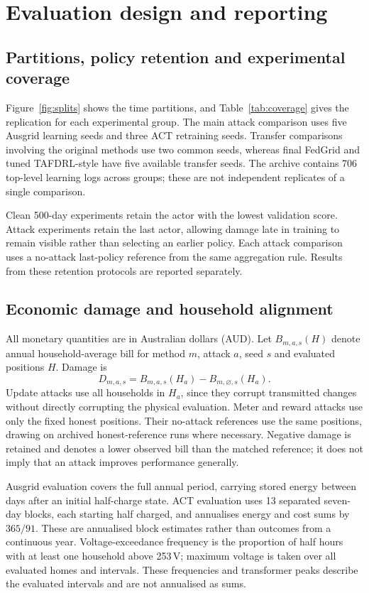 \section{Evaluation design and reporting}
\label{sec:evaluation}
\subsection{Partitions, policy retention and experimental coverage}
Figure~\ref{fig:splits} shows the time partitions, and Table~\ref{tab:coverage} gives the replication for each experimental group. The main attack comparison uses five Ausgrid learning seeds and three ACT retraining seeds. Transfer comparisons involving the original methods use two common seeds, whereas final FedGrid and tuned TAFDRL-style have five available transfer seeds. The archive contains 706 top-level learning logs across groups; these are not independent replicates of a single comparison.

Clean 500-day experiments retain the actor with the lowest validation score. Attack experiments retain the last actor, allowing damage late in training to remain visible rather than selecting an earlier policy. Each attack comparison uses a no-attack last-policy reference from the same aggregation rule. Results from these retention protocols are reported separately.



\subsection{Economic damage and household alignment}
All monetary quantities are in Australian dollars (AUD). Let $B_{m,a,s}(H)$ denote annual household-average bill for method $m$, attack $a$, seed $s$ and evaluated positions $H$. Damage is
\begin{equation}
D_{m,a,s}=B_{m,a,s}(H_a)-B_{m,\varnothing,s}(H_a).
\end{equation}
Update attacks use all households in $H_a$, since they corrupt transmitted changes without directly corrupting the physical evaluation. Meter and reward attacks use only the fixed honest positions. Their no-attack references use the same positions, drawing on archived honest-reference runs where necessary. Negative damage is retained and denotes a lower observed bill than the matched reference; it does not imply that an attack improves performance generally.

Ausgrid evaluation covers the full annual period, carrying stored energy between days after an initial half-charge state. ACT evaluation uses 13 separated seven-day blocks, each starting half charged, and annualises energy and cost sums by $365/91$. These are annualised block estimates rather than outcomes from a continuous year. Voltage-exceedance frequency is the proportion of half hours with at least one household above 253\,V; maximum voltage is taken over all evaluated homes and intervals. These frequencies and transformer peaks describe the evaluated intervals and are not annualised as sums.

